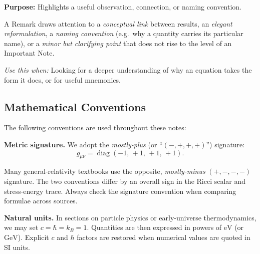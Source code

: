 \bigskip

\noindent
\begin{minipage}{0.9\textwidth}
  \begin{remark}
    \textbf{Purpose:} Highlights a useful observation, connection, or naming convention.

    A Remark draws attention to a \emph{conceptual link} between results, an
    \emph{elegant reformulation}, a \emph{naming convention} (e.g.\ why a quantity
    carries its particular name), or a \emph{minor but clarifying point} that does
    not rise to the level of an Important Note.

    \smallskip
    \textit{Use this when:} Looking for a deeper understanding of why an equation
    takes the form it does, or for useful mnemonics.
  \end{remark}
\end{minipage}


\clearpage
\subsection*{Mathematical Conventions}

The following conventions are used throughout these notes:

\medskip
\noindent\textbf{Metric signature.}\quad
We adopt the \emph{mostly-plus} (or ``$(-, +, +, +)$'') signature:
\[
  g_{\mu\nu} = \operatorname{diag}(-1,\,+1,\,+1,\,+1).
\]

\begin{importantnote}
  Many general-relativity textbooks use the opposite, \emph{mostly-minus}
  $(+,-,-,-)$ signature. The two conventions differ by an overall sign in
  the Ricci scalar and stress-energy trace.
  Always check the signature convention when comparing formulae across sources.
\end{importantnote}

\bigskip
\noindent\textbf{Natural units.}\quad
In sections on particle physics or early-universe thermodynamics,
we may set $c = \hbar = k_B = 1$.
Quantities are then expressed in powers of $\mathrm{eV}$ (or $\mathrm{GeV}$).
Explicit $c$ and $\hbar$ factors are restored when numerical values are quoted
in SI units.

